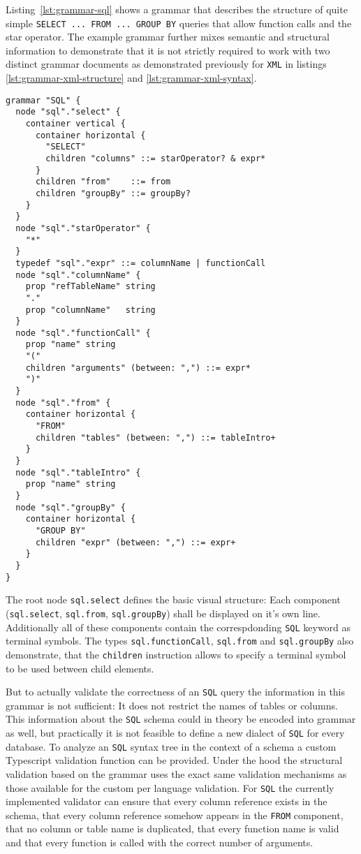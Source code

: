 \documentclass[sigconf,natbib=false]{acmart}
\begin{document}
Listing~\ref{lst:grammar-sql} shows a grammar that describes the structure of quite simple \texttt{SELECT ... FROM ... GROUP BY} queries that allow function calls and the star operator. The example grammar further mixes semantic and structural information to demonstrate that it is not strictly required to work with two distinct grammar documents as demonstrated previously for \texttt{XML} in listings \ref{lst:grammar-xml-structure} and \ref{lst:grammar-xml-syntax}.

\begin{lstlisting}[float,caption={Structure and syntax details for an \texttt{SQL} subset}, label=lst:grammar-sql]
grammar "SQL" {
  node "sql"."select" {
    container vertical {
      container horizontal {
        "SELECT"
        children "columns" ::= starOperator? & expr*
      }
      children "from"    ::= from
      children "groupBy" ::= groupBy?
    }
  }
  node "sql"."starOperator" {
    "*"
  }
  typedef "sql"."expr" ::= columnName | functionCall
  node "sql"."columnName" {
    prop "refTableName" string
    "."
    prop "columnName"   string
  }
  node "sql"."functionCall" {
    prop "name" string
    "("
    children "arguments" (between: ",") ::= expr*
    ")"
  }
  node "sql"."from" {
    container horizontal {
      "FROM"
      children "tables" (between: ",") ::= tableIntro+
    }
  }
  node "sql"."tableIntro" {
    prop "name" string
  }
  node "sql"."groupBy" {
    container horizontal {
      "GROUP BY"
      children "expr" (between: ",") ::= expr+
    }
  }
}
\end{lstlisting}

The root node \texttt{sql.select} defines the basic visual structure: Each component (\texttt{sql.select}, \texttt{sql.from}, \texttt{sql.groupBy}) shall be displayed on it's own line. Additionally all of these components contain the correspdonding \texttt{SQL} keyword as terminal symbols. The types \texttt{sql.functionCall}, \texttt{sql.from} and \texttt{sql.groupBy} also demonstrate, that the \texttt{children} instruction allows to specify a terminal symbol to be used between child elements.

But to actually validate the correctness of an \texttt{SQL} query the information in this grammar is not sufficient: It does not restrict the names of tables or columns. This information about the \texttt{SQL} schema could in theory be encoded into grammar as well, but practically it is not feasible to define a new dialect of \texttt{SQL} for every database. To analyze an \texttt{SQL} syntax tree in the context of a schema a custom Typescript validation function can be provided. Under the hood the structural validation based on the grammar uses the exact same validation mechanisms as those available for the custom per language validation. For \texttt{SQL} the currently implemented validator can ensure that every column reference exists in the schema, that every column reference somehow appears in the \texttt{FROM} component, that no column or table name is duplicated, that every function name is valid and that every function is called with the correct number of arguments.
\end{document}
